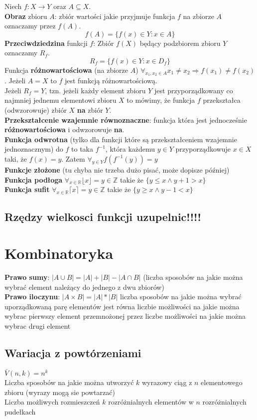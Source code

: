 \documentclass[a4paper,12pt]{article}
\begin{document}
Niech $f:X\rightarrow Y$ oraz $A \subseteq X$.\\
\textbf{Obraz} zbioru $A$: zbiór wartości jakie przyjmuje funkcja $f$ na zbiorze $A$ oznaczamy przez $f(A)$. $$f(A)=\{ f(x)\in Y:x\in A \}$$
\textbf{Przeciwdziedzina} funkcji $f$: Zbiór $f(X)$ będący podzbiorem zbioru $Y$ oznaczamy $R_f$. $$R_f=\{f(x)\in Y: x\in D_f\}$$
Funkcja \textbf{różnowartościowa} (na zbiorze $A$) $\forall_{x_1,x_2\in A} x_1\neq x_2  \Rightarrow f(x_1)\neq f(x_2)$. Jeżeli $A=X$ to $f$ jest funkcją różnowartościową.\\
Jeżeli $R_f=Y$, tzn. jeżeli każdy element zbioru $Y$ jest przyporządkowany co najmniej jednemu elementowi zbioru $X$ to mówimy, że funkcja $f$ przekształca (odwzorowuje) zbiór $X$ \textbf{na} zbiór $Y$.\\
\textbf{Przekształcenie wzajemnie równoznaczne}: funkcja która jest jednocześnie \textbf{różnowartościowa} i odwzorowuje \textbf{na}.\\
\textbf{Funkcja odwrotna} (tylko dla funkcji które są przekształceniem wzajemnie jednoznacznym) do $f$ to taka $f^{-1}$, która każdemu $y\in Y$ przyporządkowuje $x \in X$ taki, że $f(x)=y$. Zatem $\forall_{y\in Y} f(f^{-1}(y))=y$ \\
\textbf{Funkcje złożone} (tu chyba nie trzeba dużo pisać, może dopisze później) \\
\textbf{Funkcja podłoga} $\forall_{x\in \mathbb{R}} \lfloor x \rfloor=y\in \mathbb{Z}$ takie że $\{ y\leq x \wedge y+1>x \}$ \\
\textbf{Funkcja sufit} $\forall_{x\in \mathbb{R}} \lceil x \rceil=y\in \mathbb{Z}$ takie że $\{ y\geq x \wedge y-1<x \}$
\subsection{Rzędzy wielkosci funkcji uzupelnic!!!!}
\section{Kombinatoryka}
\textbf{Prawo sumy}: $|A \cup B|=|A|+|B|-|A \cap B|$ (liczba sposobów na jakie można wybrać element należący do jednego z dwu zbiorów) \\
\textbf{Prawo iloczynu}: $|A\times B|=|A|*|B|$ liczba sposobów na jakie można wybrać uporządkowaną parę elementów jest równa liczbie możliwości na jakie można wybrac pierwszy element przemnożonej przez liczbe możliwości na jakie można wybrac drugi element 
\subsection{Wariacja z powtórzeniami} $\bar V (n, k)=n^k$ \\
Liczba sposobów na jakie można utworzyć $k$ wyrazowy ciąg z $n$ elementowego zbioru (wyrazy mogą sie powtarzać) \\
Liczba możliwych rozmieszczeń $k$ rozróżnialnych elementów w $n$ rozróżnialnych pudełkach 
\end{document}
